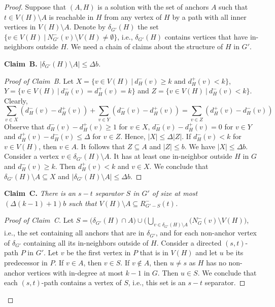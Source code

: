 \documentclass[11pt,a4paper]{article}
\begin{document}
\begin{proof}
\medskip

Suppose that $(A,H)$ is a solution with the set of anchors $A$ such that $t\in V(H)\setminus A$ is reachable in $H$ from any
vertex of $H$ by a path with all inner vertices in $V(H)\setminus A$. Denote by $\delta_{G'}(H)$ the set $\{v\in V(H)\ |\
N_{G'}^-(v)\setminus V(H)\neq \emptyset\}$, i.e., $\delta_{G'}(H)$ contains vertices that have in-neighbors outside $H$. We
need a chain of claims about the structure of $H$ in $G'$.


\medskip
\noindent
{\bf Claim~B.} {\it
$|\delta_{G'}(H)\setminus A|\leq \Delta b$.
}


\begin{proof}[Proof of Claim~B]
Let $X=\{v\in V(H)\ |\ d_H^-(v)\geq k\text{ and }d_H^+(v)<k\}$, $Y=\{v\in V(H)\ |\ d_H^-(v)=d_H^+(v)=k\}$ and $Z=\{v\in V(H)\
|\ d_H^-(v)<k\}$. Clearly, $$\sum_{v\in X}(d_H^-(v)-d_H^+(v))+ \sum_{v\in Y}(d_H^-(v)-d_H^+(v))=\sum_{v\in
Z}(d_H^+(v)-d_H^-(v))$$ Observe that $d_H^-(v)-d_H^+(v)\geq 1$ for $v\in X$,  $d_H^-(v)-d_H^+(v)=0$ for $v\in Y$ and
$d_H^+(v)-d_H^-(v)\leq \Delta$ for $v\in Z$. Hence, $|X|\leq \Delta|Z|$. If $d_H^-(v)<k$ for $v\in V(H)$, then $v\in A$. It
follows that $Z\subseteq A$ and $|Z|\leq b$. We have $|X|\leq \Delta b$. Consider a vertex $v\in \delta_{G'}(H)\setminus A$.
It has at least one in-neighbor outside $H$ in $G$ and $d_H^-(v)\geq k$. Then $d_H^+(v)<k$ and  $v\in X$. We conclude that
$\delta_{G'}(H)\setminus A\subseteq X$ and $|\delta_{G'}(H)\setminus A|\leq \Delta b$.
\end{proof}


\medskip
\noindent
{\bf Claim~C.} {\it
There is  an $s-t$ separator $S$ in $G'$ of size at most $(\Delta(k-1)+1)b$ such that
 $V(H)\setminus A\subseteq R_{G'-S}^-(t)$.
}

\begin{proof}[Proof of Claim~C]
Let $S=\Big(\delta_{G'}(H)\cap A\Big)\cup\Big(\bigcup_{v\in \delta_{G'}(H)\setminus A}(N_G^-(v)\setminus V(H)\Big)$, i.e., the
set containing all anchors that are in $\delta_{G'}$, and for each non-anchor vertex of $\delta_{G'}$ containing all its
in-neighbors outside of $H$. Consider a directed $(s,t)$-path $P$ in $G'$. Let $v$ be the first vertex in $P$ that is in
$V(H)$ and let $u$ be its predecessor in $P$. If $v\in A$, then $v\in S$. If $v\notin A$, then $u\neq s$ as $H$ has no
non-anchor vertices with in-degree at most $k-1$ in $G$. Then $u\in S$. We conclude that each $(s,t)$-path contains a vertex
of $S$, i.e., this set is an $s-t$ separator.


\end{proof}
\end{proof}
\end{document}
